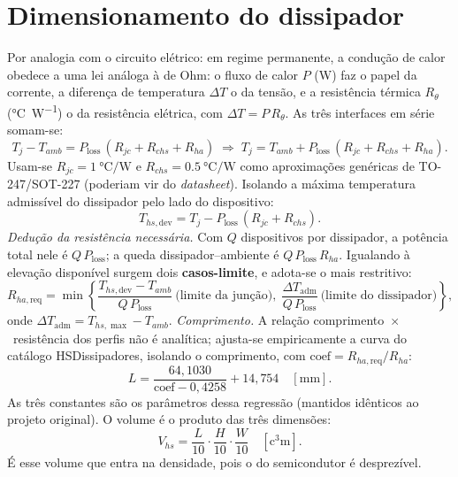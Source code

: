 \documentclass[
	a4paper, 12pt,
	chapter=TITLE, section=Title, subsection=Title,
	oneside, english, brazil, fleqn
]{abntex2}
\begin{document}
\chapter{Dimensionamento do dissipador}
Por analogia com o circuito elétrico: em regime permanente, a condução de calor obedece a
uma lei análoga à de Ohm: o fluxo de calor $P$ (\si{\watt}) faz o papel da
corrente, a diferença de temperatura $\Delta T$ o da tensão, e a resistência
térmica $R_\theta$ (\si{\degreeCelsius\per\watt}) o da resistência elétrica, com
$\Delta T=P\,R_\theta$. As três interfaces em série somam-se:
\begin{equation}
	T_j-T_{amb}=P_{\mathrm{loss}}\,(R_{jc}+R_{chs}+R_{ha})
	\;\Rightarrow\;
	T_j = T_{amb}+P_{\mathrm{loss}}\,(R_{jc}+R_{chs}+R_{ha}).
	\label{eq:chain}
\end{equation}
Usam-se $R_{jc}=\SI{1}{\degreeCelsius\per\watt}$ e
$R_{chs}=\SI{0.5}{\degreeCelsius\per\watt}$ como aproximações genéricas de
TO-247/SOT-227 (poderiam vir do \emph{datasheet}). Isolando a máxima temperatura
admissível do dissipador pelo lado do dispositivo:
\begin{equation}
	T_{hs,\mathrm{dev}} = T_j - P_{\mathrm{loss}}\,(R_{jc}+R_{chs}).
	\label{eq:ths}
\end{equation}
\textit{Dedução da resistência necessária.} Com $Q$ dispositivos por dissipador,
a potência total nele é $Q\,P_{\mathrm{loss}}$; a queda dissipador--ambiente é
$Q\,P_{\mathrm{loss}}\,R_{ha}$. Igualando à elevação disponível surgem dois
\textbf{casos-limite}, e adota-se o mais restritivo:
\begin{equation}
	R_{ha,\mathrm{req}}=\min\!\left\{
	\frac{T_{hs,\mathrm{dev}}-T_{amb}}{Q\,P_{\mathrm{loss}}}\ \text{(limite da junção)},\;
	\frac{\Delta T_{\mathrm{adm}}}{Q\,P_{\mathrm{loss}}}\ \text{(limite do dissipador)}
	\right\},
	\label{eq:rhareq}
\end{equation}
onde $\Delta T_{\mathrm{adm}}=T_{hs,\max}-T_{amb}$. \textit{Comprimento.} A
relação comprimento~$\times$~resistência dos perfis não é analítica; ajusta-se
empiricamente a curva do catálogo HSDissipadores, isolando o comprimento, com
$\mathrm{coef}=R_{ha,\mathrm{req}}/R_{ha}$:
\begin{equation}
	L = \frac{64{,}1030}{\mathrm{coef}-0{,}4258}+14{,}754\quad[\si{\milli\meter}].
	\label{eq:Lfit}
\end{equation}
As três constantes são os parâmetros dessa regressão (mantidos idênticos ao
projeto original). O volume é o produto das três dimensões:
\begin{equation}
	V_{hs}=\frac{L}{10}\cdot\frac{H}{10}\cdot\frac{W}{10}\quad[\si{\cubic\centi\meter}].
	\label{eq:vhs}
\end{equation}
É esse volume que entra na densidade, pois o do semicondutor é desprezível.
\end{document}
